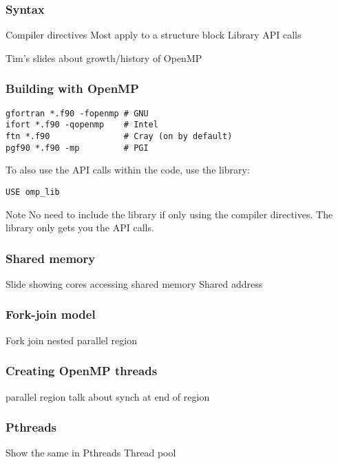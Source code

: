 \documentclass{beamer}
\begin{document}
\begin{frame}
\frametitle{Syntax}
Compiler directives
Most apply to a structure block
Library API calls
\end{frame}

\begin{frame}
Tim's slides about growth/history of OpenMP
\end{frame}

\begin{frame}[fragile]
\frametitle{Building with OpenMP}

\begin{verbatim}
gfortran *.f90 -fopenmp # GNU
ifort *.f90 -qopenmp    # Intel
ftn *.f90               # Cray (on by default)
pgf90 *.f90 -mp         # PGI
\end{verbatim}

To also use the API calls within the code, use the library:
\begin{verbatim}
USE omp_lib
\end{verbatim}

\begin{alertblock}{Note}
No need to include the library if only using the compiler directives.
The library only gets you the API calls.
\end{alertblock}
\end{frame}

\begin{frame}
\frametitle{Shared memory}
Slide showing cores accessing shared memory
Shared address
\end{frame}

\begin{frame}
\frametitle{Fork-join model}
Fork join
nested parallel region
\end{frame}

\begin{frame}
\frametitle{Creating OpenMP threads}
parallel region
talk about synch at end of region
\end{frame}

\begin{frame}
\frametitle{Pthreads}
Show the same in Pthreads
Thread pool
\end{frame}
\end{document}
